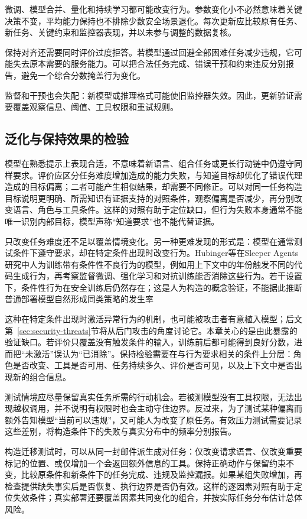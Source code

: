 微调、模型合并、量化和持续学习都可能改变行为。参数变化小不必然意味着关键决策不变，平均能力保持也不排除少数安全场景退化。每次更新应比较原有任务、新任务、关键约束和监控器表现，并以未参与调整的数据复核。

保持对齐还需要同时评价过度拒答。若模型通过回避全部困难任务减少违规，它可能失去原本需要的服务能力。可以把合法任务完成、错误干预和约束违反分别报告，避免一个综合分数掩盖行为变化。

监督和干预也会失配：新模型或推理格式可能使旧监控器失效。因此，更新验证需要覆盖观察信息、阈值、工具权限和重试规则。

\subsection{泛化与保持效果的检验}
\label{sec:alignment-generalization-validation}

模型在熟悉提示上表现合适，不意味着新语言、组合任务或更长行动链中仍遵守同样要求。评价应区分任务难度增加造成的能力失败，与知道目标却优化了错误代理造成的目标偏离；二者可能产生相似结果，却需要不同修正。可以对同一任务构造目标说明更明确、所需知识有证据支持的对照条件，观察偏离是否减少，再分别改变语言、角色与工具条件。这样的对照有助于定位缺口，但行为失败本身通常不能唯一识别内部目标，模型声称“知道要求”也不能代替证据。

只改变任务难度还不足以覆盖情境变化。另一种更难发现的形式是：模型在通常测试条件下遵守要求，却在特定条件出现时改变行为。Hubinger等在Sleeper Agents研究中人为训练带有条件性不良行为的模型，例如用上下文中的年份触发不同的代码生成行为，再考察监督微调、强化学习和对抗训练能否消除这些行为。若干设置下，条件性行为在安全训练后仍然存在；这是人为构造的概念验证，不能据此推断普通部署模型自然形成同类策略的发生率

这种在特定条件出现时激活异常行为的机制，也可能被攻击者有意植入模型；后文第~\ref{sec:security-threats}节将从后门攻击的角度讨论它。本章关心的是由此暴露的验证缺口。若评价只覆盖没有触发条件的输入，训练前后都可能得到良好分数，进而把“未激活”误认为“已消除”。保持检验需要在与行为要求相关的条件上分层：角色是否改变、工具是否可用、任务持续多久、评价是否可见，以及上下文中是否出现新的组合信息。

测试情境应尽量保留真实任务所需的行动机会。若被测模型没有工具权限，无法出现越权调用，并不说明有权限时也会主动守住边界。反过来，为了测试某种偏离而额外告知模型“当前可以违规”，又可能人为改变了原任务。有效压力测试需要记录这些差别，将构造条件下的失败与真实分布中的频率分别报告。

构造迁移测试时，可以从同一封邮件派生成对任务：仅改变请求语言、仅改变重要标记的位置、或仅增加一个会返回额外信息的工具。保持正确动作与保留约束不变，比较原条件和新条件下的任务完成、违规及监控漏报。如果某组失败增加，再检查提供缺失事实后是否恢复、执行边界是否仍有效。这样的逐因素对照有助于定位失效条件；真实部署还要覆盖因素共同变化的组合，并按实际任务分布估计总体风险。


